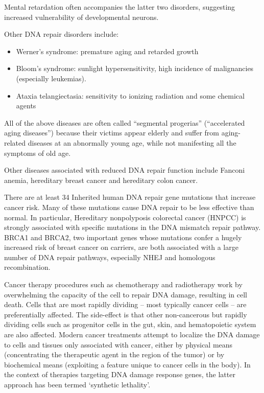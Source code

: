Mental retardation often accompanies the latter two disorders, suggesting increased vulnerability of developmental neurons.

Other DNA repair disorders include:

\begin{itemize}
\tightlist
\item
  Werner's syndrome: premature aging and retarded growth
\item
  Bloom's syndrome: sunlight hypersensitivity, high incidence of malignancies (especially leukemias).
\item
  Ataxia telangiectasia: sensitivity to ionizing radiation and some chemical agents
\end{itemize}

All of the above diseases are often called ``segmental progerias'' (``accelerated aging diseases'') because their victims appear elderly and suffer from aging-related diseases at an abnormally young age, while not manifesting all the symptoms of old age.

Other diseases associated with reduced DNA repair function include Fanconi anemia, hereditary breast cancer and hereditary colon cancer.

There are at least 34 Inherited human DNA repair gene mutations that increase cancer risk. Many of these mutations cause DNA repair to be less effective than normal. In particular, Hereditary nonpolyposis colorectal cancer (HNPCC) is strongly associated with specific mutations in the DNA mismatch repair pathway. BRCA1 and BRCA2, two important genes whose mutations confer a hugely increased risk of breast cancer on carriers, are both associated with a large number of DNA repair pathways, especially NHEJ and homologous recombination.

Cancer therapy procedures such as chemotherapy and radiotherapy work by overwhelming the capacity of the cell to repair DNA damage, resulting in cell death. Cells that are most rapidly dividing -- most typically cancer cells -- are preferentially affected. The side-effect is that other non-cancerous but rapidly dividing cells such as progenitor cells in the gut, skin, and hematopoietic system are also affected. Modern cancer treatments attempt to localize the DNA damage to cells and tissues only associated with cancer, either by physical means (concentrating the therapeutic agent in the region of the tumor) or by biochemical means (exploiting a feature unique to cancer cells in the body). In the context of therapies targeting DNA damage response genes, the latter approach has been termed `synthetic lethality'.

